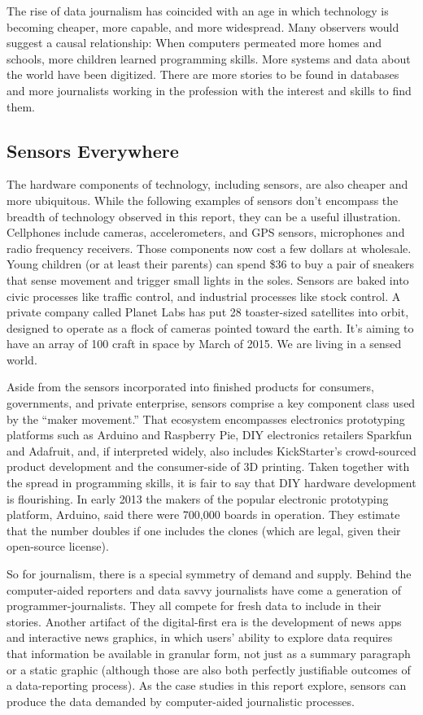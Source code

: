 The rise of data journalism has coincided with an age in which technology
is becoming cheaper, more capable, and more widespread. Many observers
would suggest a causal relationship: When computers permeated more
homes and schools, more children learned programming skills. More systems and data about the world have been digitized. There are more stories to be found in databases and more journalists working in the profession
with the interest and skills to find them.

\subsection{Sensors Everywhere}
The hardware components of technology, including sensors, are also cheaper
and more ubiquitous. While the following examples of sensors don't encompass
the breadth of technology observed in this report, they can be a useful
illustration. Cellphones include cameras, accelerometers, and GPS sensors,
microphones and radio frequency receivers. Those components now cost
a few dollars at wholesale. Young children (or at least their parents) can
spend \$36 to buy a pair of sneakers that sense movement and trigger small
lights in the soles. Sensors are baked into civic processes like traffic control,
and industrial processes like stock control. A private company called Planet
Labs has put 28 toaster-sized satellites into orbit, designed to operate as a
flock of cameras pointed toward the earth. It's aiming to have an array of
100 craft in space by March of 2015. We are living in a sensed world.

Aside from the sensors incorporated into finished products for consumers,
governments, and private enterprise, sensors comprise a key component
class used by the ``maker movement.'' That ecosystem encompasses electronics
prototyping platforms such as Arduino and Raspberry Pie, DIY electronics
retailers Sparkfun and Adafruit, and, if interpreted widely, also includes
KickStarter's crowd-sourced product development and the consumer-side
of 3D printing. Taken together with the spread in programming skills, it is
fair to say that DIY hardware development is flourishing. In early 2013 the
makers of the popular electronic prototyping platform, Arduino, said there
were 700,000 boards in operation. They estimate that the number doubles
if one includes the clones (which are legal, given their open-source license).

So for journalism, there is a special symmetry of demand and supply.
Behind the computer-aided reporters and data savvy journalists have come
a generation of programmer-journalists. They all compete for fresh data to
include in their stories. Another artifact of the digital-first era is the development
of news apps and interactive news graphics, in which users' ability
to explore data requires that information be available in granular form, not
just as a summary paragraph or a static graphic (although those are also
both perfectly justifiable outcomes of a data-reporting process). As the case
studies in this report explore, sensors can produce the data demanded by
computer-aided journalistic processes.


